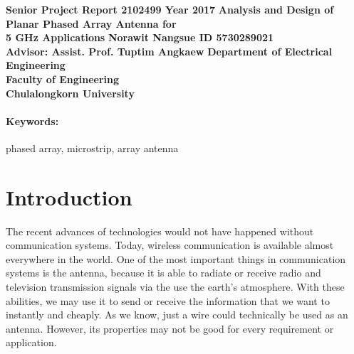 \documentclass[11pt,a4paper]{article}
\begin{document}
\thispagestyle{empty}
\vfill
\begin{center}
{
\LARGE \bf
Senior Project Report 2102499 Year 2017
}
\vfill
{
\LARGE \bf
Analysis and Design of Planar Phased Array Antenna for \\[1ex]
5 GHz Applications
}
\vfill
{\Large \bf Norawit Nangsue ID 5730289021}  \\[2ex]
{\Large \bf Advisor: Assist. Prof. Tuptim Angkaew}
\vfill
{\Large \bf Department of Electrical Engineering }\\ [2ex]
{\Large \bf Faculty of Engineering} \\ [2ex]
{\Large \bf Chulalongkorn University}
\end{center}
\newpage
\begin{abstract}
The purpose of this report is mainly to study on both the analysis and design of the 2x2 phased array antenna which each element of the arrays are a rectangular microstrip antenna. The phased array are analyzed with multiple phased difference in order to understand the phased array behavior.  A comparison between the physical and the simulation model is included.   

\end{abstract}

\paragraph{\textbf Keywords:} phased array, microstrip, array antenna \\



\newpage
\tableofcontents


\newpage
\section{Introduction}

The recent advances of technologies would not have happened without communication systems. Today, wireless communication is available almost everywhere in the world. One of the most important things in communication systems is the antenna, because it is able to radiate or receive radio and television transmission signals via the use the earth’s atmosphere. With these abilities, we may use it to send or receive the information that we want to instantly and cheaply. As we know, just a wire could technically be used as an antenna. However, its properties may not be good for every requirement or application.
\end{document}
